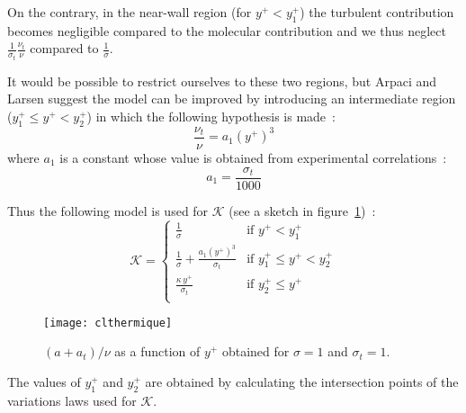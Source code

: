 On the contrary, in the near-wall region (for $y^+ < y^+_1$)
the turbulent contribution becomes negligible
compared to the molecular contribution and we thus neglect
$\displaystyle\frac{1}{\sigma_t}\frac{\nu_t}{\nu}$ compared to
$\displaystyle\frac{1}{\sigma}$.

It would be possible to restrict ourselves to these
two regions, but Arpaci and Larsen suggest the model
can be improved by introducing an intermediate
region ($y^+_1 \leqslant y^+ < y^+_2$)
in which the following hypothesis is made~:
\begin{equation}
\frac{\nu_t}{\nu} = a_1 (y^+)^3
\end{equation}
where $a_1$ is a constant whose value is obtained from
experimental correlations~:
\begin{equation}
a_1 =\displaystyle\frac{\sigma_t}{1000}
\end{equation}

Thus the following model is used for $\mathcal{K}$
(see a sketch
in figure~\ref{Base_Clptur_Fig_a_plus_at_fonction_yplus})~:
\begin{equation}
\mathcal{K}=\left\{
\begin{array}{ll}
\displaystyle\frac{1}{\sigma}
             &\text{if } y^+ < y^+_1\\
\displaystyle\frac{1}{\sigma}
+\displaystyle\frac{a_1 (y^+)^3}{\sigma_t}
             &\text{if } y^+_1 \leqslant y^+ < y^+_2\\
\displaystyle\frac{\kappa \,y^+}{\sigma_t}
             &\text{if } y^+_2\leqslant y^+\\
\end{array}
\right.
\end{equation}

\begin{figure}[htp]\label{Base_Clptur_Fig_a_plus_at_fonction_yplus}
\centerline{\texttt{[image: clthermique]}}
\caption{$(a+a_t)/\nu$ as a function of $y^+$ obtained
                       for $\sigma=1$ and $\sigma_t=1$.}
\end{figure}


The values of $y^+_1$ and $y^+_2$ are obtained by calculating
the intersection points of the variations laws used
for $\mathcal{K}$.

